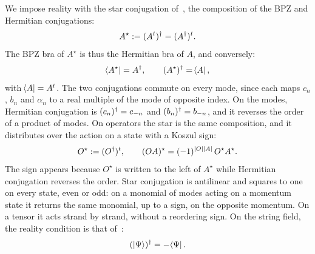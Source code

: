 We impose reality with the star conjugation of~\cite{Erbin:2021:StringFieldTheory}, the composition of the BPZ and Hermitian conjugations:
\begin{equation}
  \label{p:eq:conv:star}
  A^\star
    := {({A^t})^\dagger}
    = {({A^\dagger})^t}.
\end{equation}
The BPZ bra of $A^\star$ is thus the Hermitian bra of $A$, and conversely:
  \begin{equation}
  \label{p:eq:rea:star-bras}
  \mathinner{{}_{}\hspace{-2pt}\langle A^\star |}
    = {A^\dagger},
  \qquad
  {(A^\star)^\dagger}
    = \mathinner{{}_{}\hspace{-2pt}\langle A |},
\end{equation}
  with $\mathinner{{}_{}\hspace{-2pt}\langle A |} = {A^t}$.
  The two conjugations commute on every mode, since each maps $c_n$, $b_n$ and $\alpha_n$ to a real multiple of the mode of opposite index.
  On the modes, Hermitian conjugation is ${(c_n)^\dagger} = c_{-n}$ and ${(b_n)^\dagger} = b_{-n}$, and it reverses the order of a product of modes.
  On operators the star is the same composition, and it distributes over the action on a state with a Koszul sign:
  \begin{equation}
  \label{p:eq:rea:star-operator}
  O^\star
    := {({O^\dagger})^t},
  \qquad
  (O A)^\star
    = (-1)^{{|O|} {|A|}} \, O^\star A^\star.
\end{equation}
  The sign appears because $O^\star$ is written to the left of $A^\star$ while Hermitian conjugation reverses the order.
Star conjugation is antilinear and squares to one on every state, even or odd: on a monomial of modes acting on a momentum state it returns the same monomial, up to a sign, on the opposite momentum.
On a tensor it acts strand by strand, without a reordering sign.
On the string field, the reality condition is that of~\cite[eq.~(3.6)]{Zwiebach:1993:ClosedStringField}:
\begin{equation}
  (\ket{\Psi})^\dagger
    = - \mathinner{{}_{}\hspace{-2pt}\langle \Psi |}.
\end{equation}

